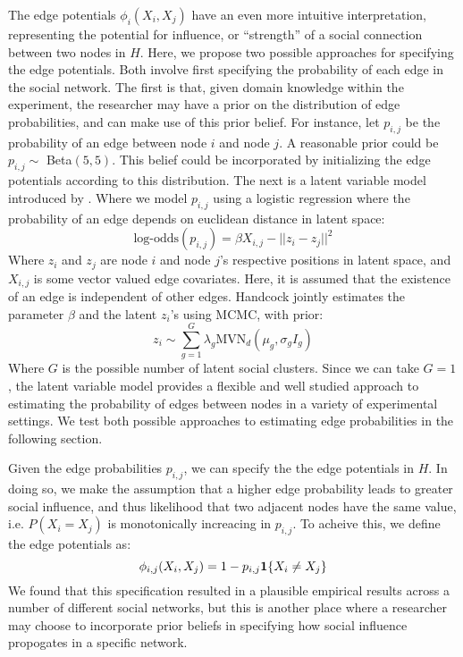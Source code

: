 \documentclass{article}
\begin{document}
The edge potentials $\phi_i(X_i, X_j)$ have an even more intuitive interpretation, representing the potential for influence, or ``strength'' of a social connection between two nodes in $H$. Here, 
we propose two possible approaches for specifying the edge potentials. Both involve first specifying the probability of each edge in the social network. The first is that, given domain knowledge within the experiment, the researcher may have a prior on the distribution of 
edge probabilities, and can make use of this prior belief. For instance, let $p_{i,j}$ be the probability of an edge between node 
$i$ and node $j$. A reasonable prior could be $p_{i,j} \sim $ Beta$(5, 5)$. This belief could be incorporated by initializing the 
edge potentials according to this distribution. The next is a latent variable model introduced by \cite{Handcock}. Where we model $p_{i,j}$ using a logistic regression where the probability of an edge depends on euclidean distance in latent space: 
\begin{equation}
  \mbox{log-odds}(p_{i,j}) = \beta X_{i,j} - ||z_i - z_j||^2
\end{equation}
Where $z_i$ and $z_j$ are node $i$ and node $j$'s respective positions in latent space, and $X_{i,j}$ is some vector valued edge covariates. Here, it is assumed that the existence of an edge is independent of other edges. 
Handcock jointly estimates the parameter $\beta$ and the latent $z_i$'s using MCMC, with prior: \begin{displaymath}
  z_i \sim \sum_{g = 1}^{G}\lambda_g \mbox{MVN}_d(\mu_g, \sigma_gI_g) 
\end{displaymath}
Where $G$ is the possible number of latent social clusters. Since we can take $G = 1$, the latent variable model provides a flexible and well 
studied approach to estimating the probability of edges between nodes in a variety of experimental settings. We test both possible approaches to estimating 
edge probabilities in the following section.

Given the edge probabilities $p_{i,j}$, we can specify the the edge potentials in $H$. In doing so, 
we make the assumption that a higher edge probability leads to greater social influence, and thus likelihood that two adjacent nodes 
have the same value, i.e. $P(X_i = X_j)$ is monotonically increacing in $p_{i,j}$. To acheive this, we define the edge potentials as:
\begin{displaymath}
  \phi_{i,j}(X_i, X_j) = 1 - p_{i,j}\mathbf{1}\{{X_i \neq X_j}\} \\[0.5ex]
\end{displaymath}
We found that this specification resulted in a plausible empirical results across a number of different social networks, but this is another place where a researcher may choose to 
incorporate prior beliefs in specifying how social influence propogates in a specific network.
\end{document}
